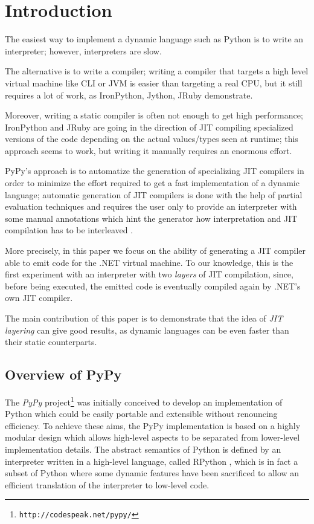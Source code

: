 \section{Introduction}
The easiest way to implement a dynamic language such as Python is to write an
interpreter; however, interpreters are slow.

The alternative is to write a compiler; writing a compiler that targets a high
level virtual machine like CLI or JVM is easier than targeting a real CPU, but
it still requires a lot of work, as IronPython, Jython, JRuby demonstrate.

Moreover, writing a static compiler is often not enough to get high
performance; IronPython and JRuby are going in the direction of JIT compiling
specialized versions of the code depending on the actual values/types seen at
runtime; this approach seems to work, but writing it manually requires an
enormous effort.

PyPy's approach \cite{RiBo07_223} is to automatize the generation of 
specializing JIT compilers in order
to minimize the effort required to get a fast implementation of a
dynamic language; automatic generation of JIT compilers is done with
the help of partial evaluation techniques and requires the user only
to provide an interpreter with some manual annotations which hint
the generator how interpretation and JIT compilation has to be interleaved \cite{PyPyJIT09}.

More precisely, in this paper we focus on the ability of generating a JIT compiler able to emit code
for the .NET virtual machine. To our knowledge, this is the first experiment with an interpreter with
two \emph{layers} of JIT compilation, since, before being executed, the
emitted code is eventually compiled again by .NET's own JIT compiler.

The main contribution of this paper is to demonstrate that the idea of
\emph{JIT layering} can give good results, as dynamic languages can be even
faster than their static counterparts.

\subsection{Overview of PyPy}

The \emph{PyPy} project\footnote{\texttt{http://codespeak.net/pypy/}}
\cite{RigoPedroni06} was initially conceived to develop an implementation of Python which
could be easily portable and extensible without renouncing efficiency.
To achieve these aims, the PyPy implementation is based on a highly
modular design which allows high-level aspects
to be separated from lower-level implementation details.
The abstract semantics of Python is defined by an interpreter written
in a high-level language, called RPython \cite{AACM-DLS07}, which is in fact a subset of
Python where some dynamic features have been sacrificed to allow an
efficient translation of the interpreter to low-level code.

